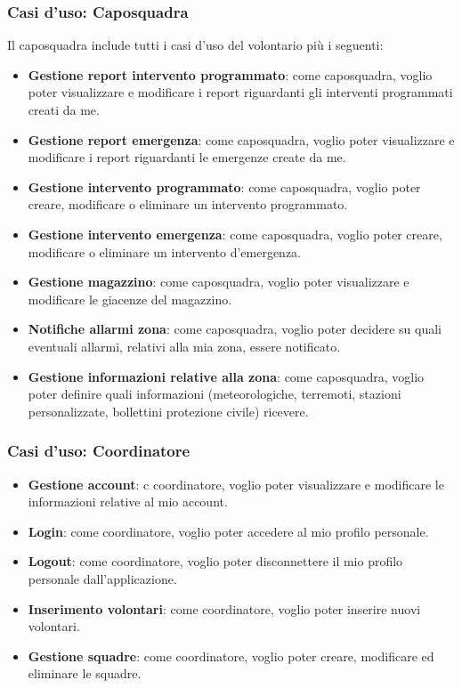 \subsubsection{Casi d'uso: Caposquadra}
Il caposquadra include tutti i casi d'uso del volontario più i seguenti:
\begin{itemize}
	\item \textbf{Gestione report intervento programmato}:
	come caposquadra, voglio poter visualizzare e modificare i report riguardanti gli interventi programmati creati da me.
	
	\item \textbf{Gestione report emergenza}:
	come caposquadra, voglio poter visualizzare e modificare i report riguardanti le emergenze create da me.
	
	\item \textbf{Gestione intervento programmato}:
	come caposquadra, voglio poter creare, modificare o eliminare un intervento programmato.
	
	\item \textbf{Gestione intervento emergenza}:
	come caposquadra, voglio poter creare, modificare o eliminare un intervento d'emergenza.
	
	\item \textbf{Gestione magazzino}:
	come caposquadra, voglio poter visualizzare e modificare le giacenze del magazzino.
	
	\item \textbf{Notifiche allarmi zona}:
	come caposquadra, voglio poter decidere su quali eventuali allarmi, relativi alla mia zona, essere notificato.
	
	\item \textbf{Gestione informazioni relative alla zona}:
	come caposquadra, voglio poter definire quali informazioni (meteorologiche, terremoti, stazioni personalizzate, bollettini protezione civile) ricevere.
\end{itemize}




\subsubsection{Casi d'uso: Coordinatore}
\begin{itemize}
	\item \textbf{Gestione account}:
	c coordinatore, voglio poter visualizzare e modificare le informazioni relative al mio account.
	
	\item \textbf{Login}:
	come coordinatore, voglio poter accedere al mio profilo personale.
	
	\item \textbf{Logout}:
	come coordinatore, voglio poter disconnettere il mio profilo personale dall'applicazione.
	
	\item \textbf{Inserimento volontari}:
	come coordinatore, voglio poter inserire nuovi volontari.
	
	\item \textbf{Gestione squadre}:
	come coordinatore, voglio poter creare, modificare ed eliminare le squadre.
\end{itemize}


